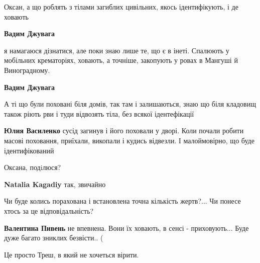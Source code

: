 
 
 
 
 

\qqSecCmt


Оксан, а що роблять з тілами загиблих цивільних, якось ідентифікують, і де
ховають

\begin{itemize} %
\textbf{Вадим Джувага} 

я намагаюся дізнатися, але поки знаю лише те, що є в інеті. Спалюють у
мобільних крематоріях, ховають, а точніше, закопують у ровах в Мангуші й
Виноградному.

\textbf{Вадим Джувага} 

А ті що були поховані біля домів, так там і залишаються, знаю що біля кладовищ
також ріють рви і туди відвозять тіла, без всякої ідентефікації

\textbf{Юлия Василенко} сусід загинув і його поховали у дворі. Коли почали робити масові поховання, приїхали, викопали і кудись відвезли. І малоймовірно, що буде ідентифікований
\end{itemize} %


Оксана, подiлюся?

\begin{itemize} %
\textbf{Natalia Kagadiy} так, звичайно
\end{itemize} %


Чи буде колись порахована і встановлена точна кількість жертв?... Чи понесе
хтось за це відповідальність?

\begin{itemize} %
\textbf{Валентина Пивень} не впевнена. Вони їх ховають, в сенсі - приховують... Буде дуже багато зниклих безвісти.. (
\end{itemize} %


Це просто Треш, в який не хочеться вірити.

